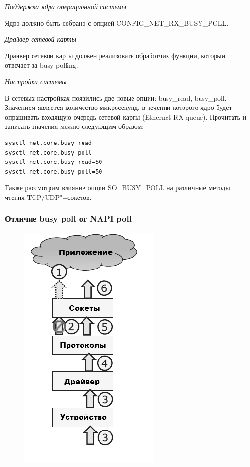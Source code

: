 \documentclass[10pt, a5paper]{article}
\begin{document}
\textit{Поддержка ядра операционной системы}

Ядро должно быть собрано с опцией \linebreak CONFIG\_NET\_RX\_BUSY\_POLL.

\textit{Драйвер сетевой карты}

Драйвер сетевой карты должен реализовать обработчик функции, который отвечает за busy polling.

\textit{Настройки системы}

В сетевых настройках появились две новые опции: busy\_read, busy\_poll.
Значением является количество микросекунд, в течении которого ядро будет опрашивать входящую очередь сетевой карты (Ethernet RX queue).
Прочитать и записать значения можно следующим образом:

\begin{verbatim}
sysctl net.core.busy_read 
sysctl net.core.busy_poll
sysctl net.core.busy_read=50
sysctl net.core.busy_poll=50
\end{verbatim}

Также рассмотрим влияние опции SO\_BUSY\_POLL на различные методы чтения TCP/UDP"=сокетов.

\subsubsection*{Отличие busy poll от NAPI poll}

\begin{figure}[h!]
  \centering 
  \includegraphics[scale=0.6]{15_2015_classic-packet-path-wo-busy-poll-ru}
\end{figure}
\end{document}
